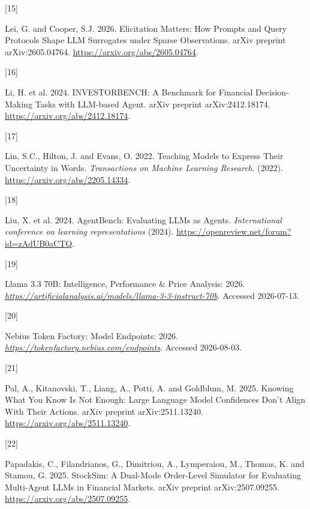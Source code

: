 \documentclass[
  10pt,
]{article}
\newlength{\cslhangindent}
\newlength{\csllabelwidth}
\newenvironment{CSLReferences}[2] %
 {\begin{list}{}{%
  \setlength{\itemindent}{0pt}
  \setlength{\leftmargin}{0pt}
  \setlength{\parsep}{0pt}
  \ifodd #1
   \setlength{\leftmargin}{\cslhangindent}
   \setlength{\itemindent}{-1\cslhangindent}
  \fi
  \setlength{\itemsep}{#2\baselineskip}}}
 {\end{list}}
\newcommand{\CSLLeftMargin}[1]{\parbox[t]{\csllabelwidth}{\strut#1\strut}}
\newcommand{\CSLRightInline}[1]{\parbox[t]{\linewidth - \csllabelwidth}{\strut#1\strut}}
\begin{document}
\begin{CSLReferences}{0}{0}
\CSLLeftMargin{{[}15{]} }%
\CSLRightInline{Lei, G. and Cooper, S.J. 2026. {Elicitation Matters: How Prompts and Query Protocols Shape LLM Surrogates under Sparse Observations}. arXiv preprint arXiv:2605.04764. \url{https://arxiv.org/abs/2605.04764}.}

\CSLLeftMargin{{[}16{]} }%
\CSLRightInline{Li, H. et al. 2024. {INVESTORBENCH: A Benchmark for Financial Decision-Making Tasks with LLM-based Agent}. arXiv preprint arXiv:2412.18174. \url{https://arxiv.org/abs/2412.18174}.}

\CSLLeftMargin{{[}17{]} }%
\CSLRightInline{Lin, S.C., Hilton, J. and Evans, O. 2022. {Teaching Models to Express Their Uncertainty in Words}. \emph{Transactions on Machine Learning Research}. (2022). \url{https://arxiv.org/abs/2205.14334}.}

\CSLLeftMargin{{[}18{]} }%
\CSLRightInline{Liu, X. et al. 2024. {AgentBench: Evaluating LLMs as Agents}. \emph{International conference on learning representations} (2024). \url{https://openreview.net/forum?id=zAdUB0aCTQ}.}

\CSLLeftMargin{{[}19{]} }%
\CSLRightInline{{Llama 3.3 70B: Intelligence, Performance \& Price Analysis}: 2026. \href{https://artificialanalysis.ai/models/llama-3-3-instruct-70b}{\emph{https://artificialanalysis.ai/models/llama-3-3-instruct-70b}}. Accessed 2026-07-13.}

\CSLLeftMargin{{[}20{]} }%
\CSLRightInline{{Nebius Token Factory: Model Endpoints}: 2026. \href{https://tokenfactory.nebius.com/endpoints}{\emph{https://tokenfactory.nebius.com/endpoints}}. Accessed 2026-08-03.}

\CSLLeftMargin{{[}21{]} }%
\CSLRightInline{Pal, A., Kitanovski, T., Liang, A., Potti, A. and Goldblum, M. 2025. {Knowing What You Know Is Not Enough: Large Language Model Confidences Don't Align With Their Actions}. arXiv preprint arXiv:2511.13240. \url{https://arxiv.org/abs/2511.13240}.}

\CSLLeftMargin{{[}22{]} }%
\CSLRightInline{Papadakis, C., Filandrianos, G., Dimitriou, A., Lymperaiou, M., Thomas, K. and Stamou, G. 2025. {StockSim: A Dual-Mode Order-Level Simulator for Evaluating Multi-Agent LLMs in Financial Markets}. arXiv preprint arXiv:2507.09255. \url{https://arxiv.org/abs/2507.09255}.}


\end{CSLReferences}
\end{document}

